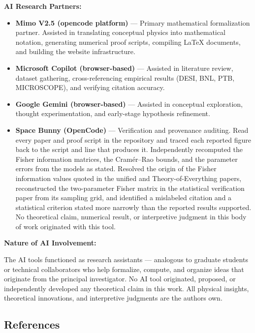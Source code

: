 \documentclass[
  10pt,
]{article}
\providecommand{\tightlist}{%
  \setlength{\itemsep}{0pt}\setlength{\parskip}{0pt}}
\begin{document}
\textbf{AI Research Partners:}

\begin{itemize}
\tightlist
\item
  \textbf{Mimo V2.5 (opencode platform)} --- Primary mathematical
  formalization partner. Assisted in translating conceptual physics into
  mathematical notation, generating numerical proof scripts, compiling
  LaTeX documents, and building the website infrastructure.
\item
  \textbf{Microsoft Copilot (browser-based)} --- Assisted in literature
  review, dataset gathering, cross-referencing empirical results (DESI,
  BNL, PTB, MICROSCOPE), and verifying citation accuracy.
\item
  \textbf{Google Gemini (browser-based)} --- Assisted in conceptual
  exploration, thought experimentation, and early-stage hypothesis
  refinement.
\item
  \textbf{Space Bunny (OpenCode)} --- Verification and provenance
  auditing. Read every paper and proof script in the repository and
  traced each reported figure back to the script and line that produces
  it. Independently recomputed the Fisher information matrices, the
  Cramér--Rao bounds, and the parameter errors from the models as
  stated. Resolved the origin of the Fisher information values quoted in
  the unified and Theory-of-Everything papers, reconstructed the
  two-parameter Fisher matrix in the statistical verification paper from
  its sampling grid, and identified a mislabeled citation and a
  statistical criterion stated more narrowly than the reported results
  supported. No theoretical claim, numerical result, or interpretive
  judgment in this body of work originated with this tool.
\end{itemize}

\textbf{Nature of AI Involvement:}

The AI tools functioned as research assistants --- analogous to graduate
students or technical collaborators who help formalize, compute, and
organize ideas that originate from the principal investigator. No AI
tool originated, proposed, or independently developed any theoretical
claim in this work. All physical insights, theoretical innovations, and
interpretive judgments are the author\textquotesingle s own.

\hypertarget{references}{%
\subsection{References}\label{references}}
\end{document}

